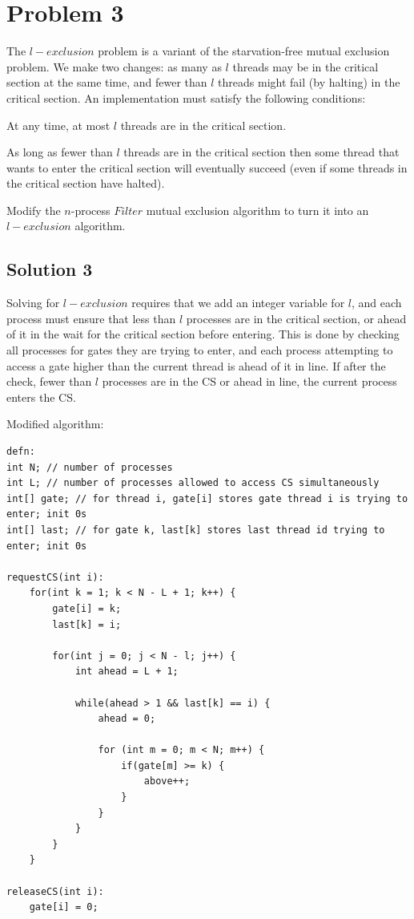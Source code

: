 \documentclass{article}
\begin{document}
\pagebreak
\section{Problem 3}
The $l-exclusion$ problem is a variant of the starvation-free mutual exclusion problem. We make two changes: as many as $l$ threads may be in the critical section at the same time, and fewer than $l$ threads might fail (by halting) in the critical section. An implementation must satisfy the following conditions:

\begin{description}[font=\scshape\bfseries]
\item [$l-Exclusion$:] At any time, at most $l$ threads are in the critical section.
\item [$l-Starvation-Freedom$:] As long as fewer than $l$ threads are in the critical section then some thread that wants to enter the critical section will eventually succeed (even if some threads in the critical section have halted).
\end{description}

Modify the $n$-process $Filter$ mutual exclusion algorithm to turn it into an $l-exclusion$ algorithm.

\subsection{Solution 3}
Solving for $l-exclusion$ requires that we add an integer variable for $l$, and each process must ensure that less than $l$ processes are in the critical section, or ahead of it in the wait for the critical section before entering. This is done by checking all processes for gates they are trying to enter, and each process attempting to access a gate higher than the current thread is ahead of it in line. If after the check, fewer than $l$ processes are in the CS or ahead in line, the current process enters the CS.

Modified algorithm:

\begin{lstlisting}
defn:
int N; // number of processes
int L; // number of processes allowed to access CS simultaneously
int[] gate; // for thread i, gate[i] stores gate thread i is trying to enter; init 0s
int[] last; // for gate k, last[k] stores last thread id trying to enter; init 0s

requestCS(int i):
	for(int k = 1; k < N - L + 1; k++) {
		gate[i] = k;
		last[k] = i;
		
		for(int j = 0; j < N - l; j++) {
			int ahead = L + 1;
			
			while(ahead > 1 && last[k] == i) {
				ahead = 0;
				
				for (int m = 0; m < N; m++) {
					if(gate[m] >= k) {
						above++;
					}
				}
			}
		}
	}
	
releaseCS(int i):
	gate[i] = 0;



\end{lstlisting}
\end{document}
